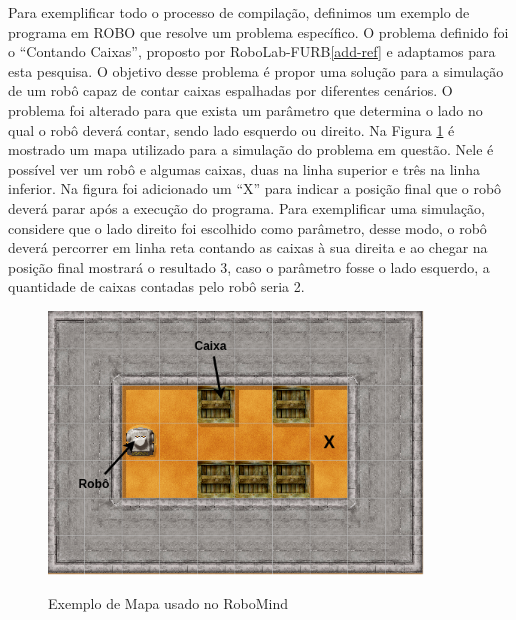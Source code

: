 Para exemplificar todo o processo de compilação, definimos um exemplo de programa em ROBO que resolve um problema específico. O problema definido foi o ``Contando Caixas'', proposto por RoboLab-FURB\ref{add-ref} e adaptamos para esta pesquisa. O objetivo desse problema é propor uma solução para a simulação de um robô capaz de contar caixas espalhadas por diferentes cenários. O problema foi alterado para que exista um parâmetro que determina o lado no qual o robô deverá contar, sendo lado esquerdo ou direito. Na Figura \ref{fig:map} é mostrado um mapa utilizado para a simulação do problema em questão. Nele é possível ver um robô e algumas caixas, duas na linha superior e três na linha inferior. Na figura foi adicionado um ``X'' para indicar a posição final que o robô deverá parar após a execução do programa. Para exemplificar uma simulação, considere que o lado direito foi escolhido como parâmetro, desse modo, o robô deverá percorrer em linha reta contando as caixas à sua direita e ao chegar na posição final mostrará o resultado 3, caso o parâmetro fosse o lado esquerdo, a quantidade de caixas contadas pelo robô seria 2.

\begin{figure}[h]
\centering
\caption{Exemplo de Mapa usado no RoboMind}
\includegraphics[height=7cm]{figuras/map2.png}
\label{fig:map}
\end{figure}

